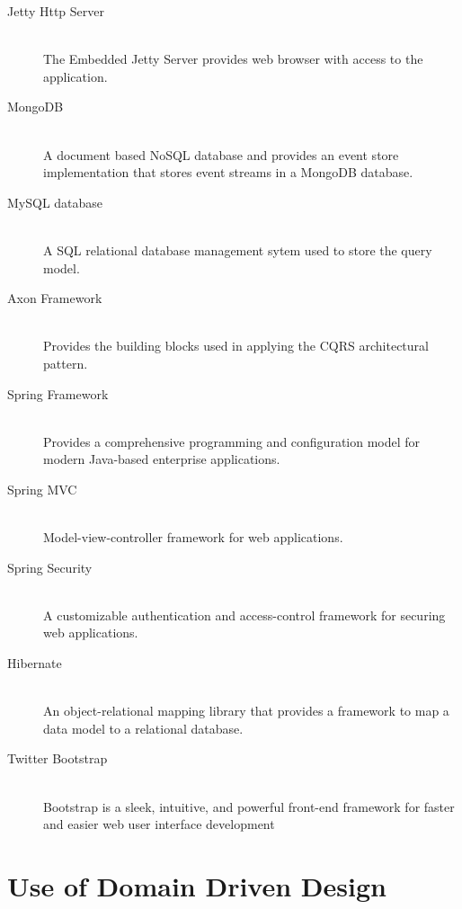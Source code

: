 \begin{description}

  \item[Jetty Http Server] \hfill \\ The Embedded Jetty Server provides web
    browser with access to the application.

  \item[MongoDB ] \hfill \\ A document based NoSQL database and provides an
    event store implementation that stores event streams in a MongoDB database.

  \item[MySQL database ] \hfill \\ A SQL relational database management sytem
    used to store the query model.

  \item[Axon Framework ] \hfill \\ Provides the building blocks used in
    applying the CQRS architectural pattern.

  \item[Spring Framework ] \hfill \\ Provides a comprehensive programming and
    configuration model for modern Java-based enterprise applications.

  \item[Spring MVC ] \hfill \\ Model-view-controller framework for web
    applications.

  \item[Spring Security ] \hfill \\ A customizable authentication and
    access-control framework for securing web applications.

  \item[Hibernate ] \hfill \\ An object-relational mapping library that
    provides a framework to map a data model to a relational database.

  \item[Twitter Bootstrap ] \hfill \\ Bootstrap is a sleek, intuitive, and
    powerful front-end framework for faster and easier web user interface
    development \cite{bootstrap}

\end{description}

\section{Use of Domain Driven Design}

